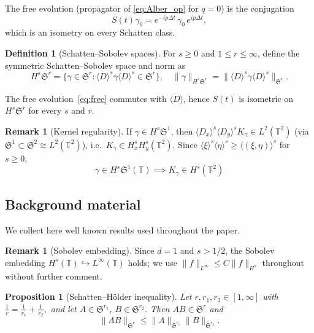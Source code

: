 \documentclass[11pt]{amsart}
\newtheorem{proposition}[theorem]{Proposition}
\theoremstyle{definition}
\newtheorem{definition}[theorem]{Definition}
\newtheorem{remark}[theorem]{Remark}
\newcommand{\T}{\mathbb{T}}
\newcommand{\Sp}{\mathfrak{S}}
\begin{document}
The free evolution (propagator of \eqref{eq:Alber_op} for $q=0$) is the conjugation
\begin{equation}\label{eq:free}
  S(t)\gamma_0 = e^{-ip\Delta t}\,\gamma_0\,e^{ip\Delta t},
\end{equation}
which is an isometry on every Schatten class.

\begin{definition}[Schatten--Sobolev spaces]
For $s\ge 0$ and $1\le r\le\infty$, define the symmetric Schatten--Sobolev space and norm as
\begin{equation}\label{eq:HsSr}
  H^s\Sp^r = \bigl\{\gamma\in\Sp^r :
  \langle D\rangle^s\gamma\langle D\rangle^s
  \in\Sp^r\bigr\},
  \quad
  \|\gamma\|_{H^s\Sp^r}
  = \|\langle D\rangle^s\gamma
  \langle D\rangle^s\|_{\Sp^r}.
\end{equation}
\end{definition}

The free evolution~\eqref{eq:free} commutes with $\langle D\rangle$, hence $S(t)$ is isometric on $H^s\Sp^r$ for every $s$ and $r$.

\begin{remark}[Kernel regularity]\label{rem:kernel_reg}
If $\gamma\in H^s\Sp^1$, then $\langle D_x\rangle^s\langle D_y\rangle^s K_\gamma\in L^2(\T^2)$ (via $\Sp^1\subset\Sp^2\cong L^2(\T^2)$), i.e.\ $K_\gamma\in H^s_x H^s_y(\T^2)$. Since $\langle\xi\rangle^s\langle\eta\rangle^s \ge\langle(\xi,\eta)\rangle^s$ for $s\ge 0,$ 
\[
\gamma \in H^s\Sp^1(\T)\implies K_\gamma \in  H^s(\T^2)
\]
\end{remark}

\subsection{Background material}\label{subsec:background}

We collect here well known results used throughout the paper.

\begin{remark}[Sobolev embedding]\label{rem:sobolev}
Since $d=1$ and $s>1/2$, the Sobolev embedding $H^s(\T)\hookrightarrow L^\infty(\T)$ holds; we use $\|f\|_{L^\infty}\le C\|f\|_{H^s}$ throughout without further comment.
\end{remark}

\begin{proposition}[Schatten--H\"older inequality]\label{prop:schatten_holder}
Let $r,r_1,r_2\in[1,\infty]$ with $\frac{1}{r}=\frac{1}{r_1}+\frac{1}{r_2},$ and let $A\in\Sp^{r_1}$, $B\in\Sp^{r_2}.$ Then $AB\in\Sp^r$ and
\begin{equation}\label{eq:schatten_holder}
  \|AB\|_{\Sp^r}\le\|A\|_{\Sp^{r_1}}\|B\|_{\Sp^{r_2}}.
\end{equation}
\end{proposition}
\end{document}
